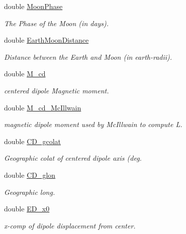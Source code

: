 \begin{CompactItemize}
double \hyperlink{struct_lgm___c_trans_830a6cb034c6c685051715f4170252db}{MoonPhase}
\begin{CompactList}\small\item\em The Phase of the Moon (in days). \item\end{CompactList}\item 
double \hyperlink{struct_lgm___c_trans_cf0375085710ac389d2bec865d0fe059}{EarthMoonDistance}
\begin{CompactList}\small\item\em Distance between the Earth and Moon (in earth-radii). \item\end{CompactList}\item 
double \hyperlink{struct_lgm___c_trans_f70c8accde2f7cb1977db97dc8f3ad9e}{M\_\-cd}
\begin{CompactList}\small\item\em centered dipole Magnetic moment. \item\end{CompactList}\item 
double \hyperlink{struct_lgm___c_trans_2cfdfbacf9fe8b4ab1ad122903c54619}{M\_\-cd\_\-McIllwain}
\begin{CompactList}\small\item\em magnetic dipole moment used by McIllwain to compute L. \item\end{CompactList}\item 
double \hyperlink{struct_lgm___c_trans_d1dc347c863f31e708763ed3f8731173}{CD\_\-gcolat}
\begin{CompactList}\small\item\em Geographic colat of centered dipole axis (deg. \item\end{CompactList}\item 
double \hyperlink{struct_lgm___c_trans_3ce26131d2fbc511d6d6d5ac0efd5261}{CD\_\-glon}
\begin{CompactList}\small\item\em Geographic long. \item\end{CompactList}\item 
double \hyperlink{struct_lgm___c_trans_7adca911ad76a7b1b97969e38e9852ba}{ED\_\-x0}
\begin{CompactList}\small\item\em x-comp of dipole displacement from center. \item\end{CompactList}\item 

\end{CompactItemize}
